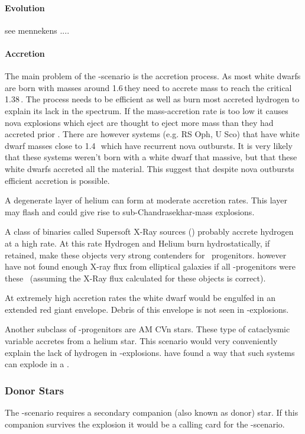 \paragraph{Evolution}

see mennekens ....


\paragraph{Accretion}
The main problem of the \sd-scenario is the accretion process.  As most white dwarfs are born with masses around 1.6\,\msun they need to accrete mass to reach the critical 1.38\,\msun. The process needs to be efficient as well as burn most accreted hydrogen to explain its lack in the spectrum.
 If the mass-accretion rate is too low it causes nova explosions which eject are thought to eject more mass than they had accreted prior \citep{Nomoto:1982p451}. There are however systems (e.g. RS Oph, U Sco) that have white dwarf masses close to 1.4\,\msun\ which have recurrent nova outbursts. It is very likely that these systems weren't born with a white dwarf that massive, but that these white dwarfs accreted all the material. This suggest that despite nova outbursts efficient accretion is possible.
 
 
 A degenerate layer of helium can form at moderate accretion rates. This layer may flash and could give rise to sub-Chandrasekhar-mass explosions.
 
 A class of binaries called Supersoft X-Ray sources (\sss) probably accrete hydrogen at a high rate. At this rate Hydrogen and Helium burn hydrostatically, if retained, make these objects very strong contenders for \snia\ progenitors. \cite{2010Natur.463..924G} however have not found enough  X-ray flux from elliptical galaxies if all \snia-progenitors were these \sss\ (assuming the X-Ray flux calculated for these objects is correct). 
 
At extremely high accretion rates the white dwarf would be engulfed in an extended red giant envelope. Debris of this envelope is not seen in \snia-explosions. 

Another subclass of \sd-progenitors are AM CVn stars. These type of cataclysmic variable accretes from a helium star. This scenario would very conveniently explain the lack of hydrogen in \snia-explosions. \citet[see section \ref{sec:snia_theory}][]{2010A&A...514A..53F} have found a way that such systems can explode in a \snia.


\subsubsection{Donor Stars}
The \sd-scenario requires a secondary companion (also known as donor) star. If this companion survives the explosion it would be a calling card for the \sd-scenario. 

